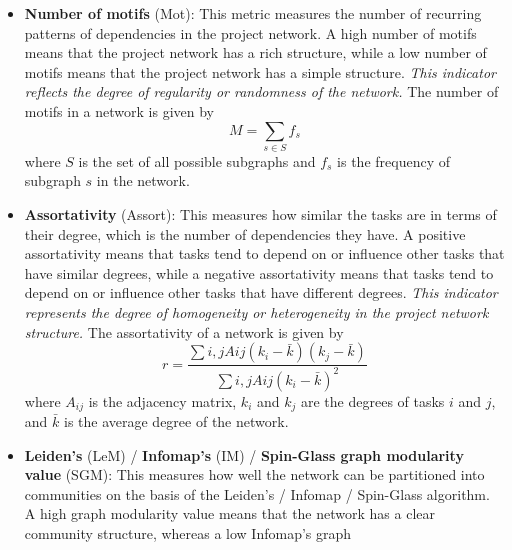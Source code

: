 \documentclass[preprint,
3p]{elsarticle} %
\begin{document}
\begin{appendices}
\begin{itemize}
  asymmetry means that the network is more balanced. \emph{This
  indicator reflects the degree of inequality or diversity in the
  network structure.} The vertex asymmetry of a network is given by
  \begin{equation}
  VAs = \frac {1} {n(n-1)} \sum_{u,v \in V} |k_u - k_v|
  \end{equation} \noindent where \(V\) is the set of tasks and \(k_u\)
  and \(k_v\) are the degrees of tasks \(u\) and \(v\), respectively.
\item
  \textbf{Number of motifs} (Mot): This metric measures the number of
  recurring patterns of dependencies in the project network. A high
  number of motifs means that the project network has a rich structure,
  while a low number of motifs means that the project network has a
  simple structure. \emph{This indicator reflects the degree of
  regularity or randomness of the network.} The number of motifs in a
  network is given by \begin{equation}
  M = \sum_{s \in S} f_s \label{eq:Mot}
  \end{equation} \noindent   where \(S\) is the set of all possible
  subgraphs and \(f_s\) is the frequency of subgraph \(s\) in the
  network.
\item
  \textbf{Assortativity} (Assort): This measures how similar the tasks
  are in terms of their degree, which is the number of dependencies they
  have. A positive assortativity means that tasks tend to depend on or
  influence other tasks that have similar degrees, while a negative
  assortativity means that tasks tend to depend on or influence other
  tasks that have different degrees. \emph{This indicator represents the
  degree of homogeneity or heterogeneity in the project network
  structure.} The assortativity of a network is given by
  \begin{equation}
  r = \frac {\sum {i,j} A{ij}(k_i - \bar{k})(k_j - \bar{k})} {\sum {i,j} A{ij}(k_i - \bar{k})^2}\label{eq:Assort}
  \end{equation} \noindent where \(A_{ij}\) is the adjacency matrix,
  \(k_i\) and \(k_j\) are the degrees of tasks \(i\) and \(j\), and
  \(\bar{k}\) is the average degree of the network.
\item
  \textbf{Leiden's} (LeM) / \textbf{Infomap's} (IM) / \textbf{Spin-Glass
  graph modularity value} (SGM): This measures how well the network can
  be partitioned into communities on the basis of the Leiden's / Infomap
  / Spin-Glass algorithm. A high graph modularity value means that the
  network has a clear community structure, whereas a low Infomap's graph

\end{itemize}
\end{appendices}
\end{document}
